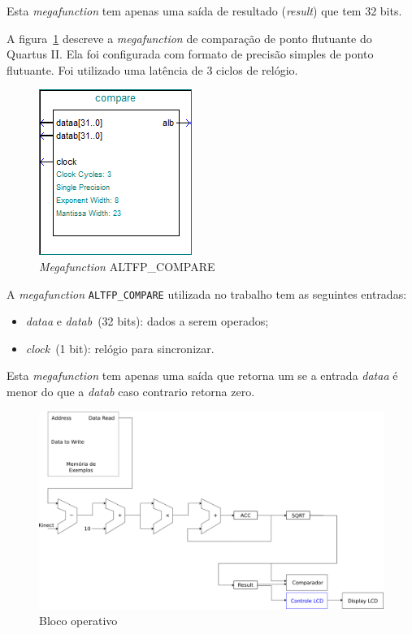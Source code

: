 \documentclass[12pt]{article}
\begin{document}
Esta \textit{megafunction} tem apenas uma saída de resultado (\textit{result})
que tem 32 bits.


A figura~\ref{fig:compare} descreve a \textit{megafunction} de comparação de
ponto flutuante do Quartus II. Ela foi configurada com formato de precisão
simples de ponto flutuante. Foi utilizado uma latência de 3 ciclos de relógio.

\begin{figure}[h]
\centering
\includegraphics[width=.3\textwidth]{../apresentacao/compare}
\caption{\textit{Megafunction} ALTFP\_COMPARE}
\label{fig:compare}
\end{figure}

A \textit{megafunction} \verb|ALTFP_COMPARE| utilizada no trabalho tem as
seguintes entradas:
\begin{itemize}
\item \textit{dataa} e \textit{datab}~(32 bits): dados a serem operados;
\item \textit{clock}~(1 bit): relógio para sincronizar.
\end{itemize}

Esta \textit{megafunction} tem apenas uma saída que retorna um se a entrada
\textit{dataa} é menor do que a \textit{datab} caso contrario retorna zero.

\begin{figure}[h]
\centering
\includegraphics[width=.7\textwidth]{../apresentacao/knn_sem_controle}
\caption{Bloco operativo}
\label{fig:blocoperativo}
\end{figure}
\end{document}
